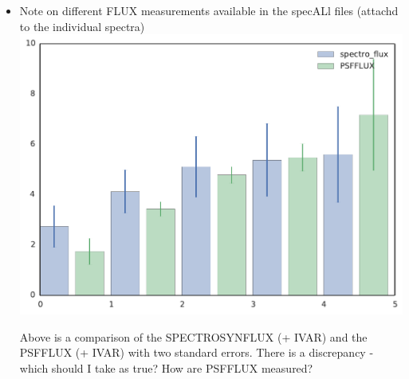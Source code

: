 \documentclass[11pt]{article}
\begin{document}
\begin{itemize}
\item Note on different FLUX measurements available in the specALl files (attachd to the individual spectra)\\

\includegraphics[width=.8\textwidth]{figs/psfflux_vs_spectroflux}

Above is a comparison of the SPECTROSYNFLUX (+ IVAR) and the PSFFLUX (+ IVAR) with two standard errors.  There is a discrepancy - which should I take as true?  How are PSFFLUX measured?  

\end{itemize}




%
\end{document}
